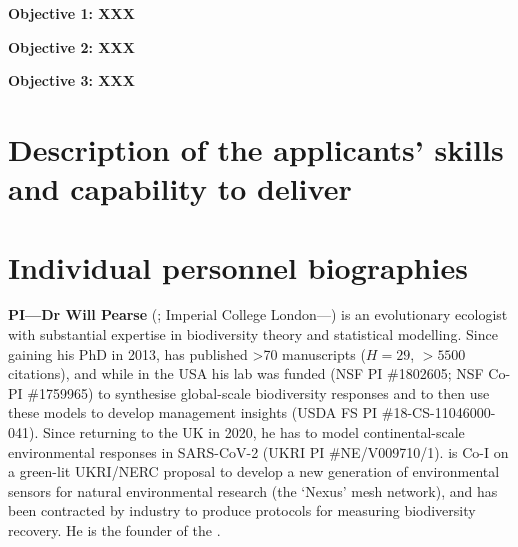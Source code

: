 \clearpage
\begin{mdframed}[roundcorner=0pt, backgroundcolor=blue!40, innertopmargin=\topskip, leftmargin=0, rightmargin=0, splittopskip=\topskip, ntheorem=true, linecolor=gray!40]
  \textbf{Objective 1: XXX}
\end{mdframed}

\clearpage
\begin{mdframed}[roundcorner=0pt, backgroundcolor=red!40, innertopmargin=\topskip, leftmargin=0, rightmargin=0, splittopskip=\topskip, ntheorem=true, linecolor=gray!40]
  \textbf{Objective 2: XXX}
\end{mdframed}

\clearpage
\begin{mdframed}[roundcorner=0pt, backgroundcolor=red!40, innertopmargin=\topskip, leftmargin=0, rightmargin=0, splittopskip=\topskip, ntheorem=true, linecolor=gray!40]
  \textbf{Objective 3: XXX}
\end{mdframed}

\clearpage
\section*{\Large Description of the applicants' skills and capability to deliver}
\vspace{-12pt}\section*{\large Individual personnel biographies}
\vspace{-8pt}
\textbf{PI---Dr Will Pearse} (\WP; Imperial College London---\ICL) is an evolutionary ecologist with substantial expertise in biodiversity theory and statistical modelling. Since gaining his PhD in 2013, \WP has published >70 manuscripts ($H=29$, $>5500$ citations), and while in the USA his lab was funded (NSF PI \#1802605; NSF Co-PI \#1759965) to synthesise global-scale biodiversity responses \supercite{Gallinat2021} and to then use these models to develop management insights \supercite{Weglarz2021} (USDA FS PI \#18-CS-11046000-041). Since returning to the UK in 2020, he has to model continental-scale environmental responses in SARS-CoV-2 \supercite{Smith2021} (UKRI PI \#NE/V009710/1). \WP is Co-I on a green-lit UKRI/NERC proposal to develop a new generation of environmental sensors for natural environmental research (the `Nexus' mesh network), and has been contracted by industry to produce protocols for measuring biodiversity recovery. He is the founder of the \EFN.

